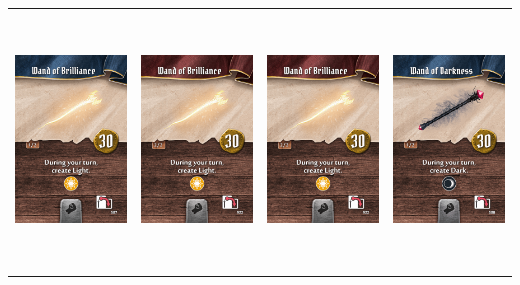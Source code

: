\documentclass{minimal}
\begin{document}
{\begin{longtable}{llll}
\includegraphics[width=44mm,height=68mm]{./64-151/gh-087a-wand-of-brilliance.png} &
\includegraphics[width=44mm,height=68mm]{./64-151/gh-087b-wand-of-brilliance.png} &
\includegraphics[width=44mm,height=68mm]{./64-151/gh-087b-wand-of-brilliance.png} &
\includegraphics[width=44mm,height=68mm]{./64-151/gh-088a-wand-of-darkness.png}\\ 

\end{longtable}}
\end{document}
